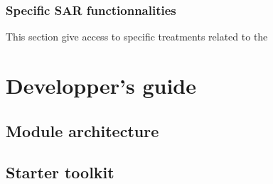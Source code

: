 \documentclass{InsightSoftwareGuide}
\newif\ifitkPrintedVersion
\begin{document}
\section{Specific SAR functionnalities}
This section give access to specific treatments related to the 


\part{Developper's guide}\label{part:developperguide}
\chapter{Module architecture}
\chapter{Starter toolkit}

% 
% 


% 
% 
% 

\backmatter

%
%

% 




%
%





\end{document}

